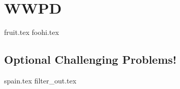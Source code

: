 \documentclass{exam}
\begin{document}
\newpage
\section{WWPD}
\begin{questions}
{fruit.tex}
{foohi.tex}
\end{questions}

\newpage
\begin{questions}
\section{Optional Challenging Problems!}
{spain.tex}
\newpage
{filter_out.tex}
\end{questions}
\end{document}
